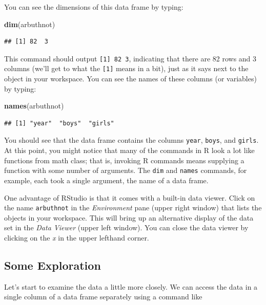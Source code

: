 \documentclass[]{article}
\newenvironment{Shaded}{\begin{snugshade}}{\end{snugshade}}
\newcommand{\KeywordTok}[1]{\textcolor[rgb]{0.13,0.29,0.53}{\textbf{#1}}}
\newcommand{\NormalTok}[1]{#1}
\begin{document}
You can see the dimensions of this data frame by typing:

\begin{Shaded}
\begin{Highlighting}[]
\KeywordTok{dim}\NormalTok{(arbuthnot)}
\end{Highlighting}
\end{Shaded}

\begin{verbatim}
## [1] 82  3
\end{verbatim}

This command should output \texttt{{[}1{]}\ 82\ 3}, indicating that
there are 82 rows and 3 columns (we'll get to what the \texttt{{[}1{]}}
means in a bit), just as it says next to the object in your workspace.
You can see the names of these columns (or variables) by typing:

\begin{Shaded}
\begin{Highlighting}[]
\KeywordTok{names}\NormalTok{(arbuthnot)}
\end{Highlighting}
\end{Shaded}

\begin{verbatim}
## [1] "year"  "boys"  "girls"
\end{verbatim}

You should see that the data frame contains the columns \texttt{year},
\texttt{boys}, and \texttt{girls}. At this point, you might notice that
many of the commands in R look a lot like functions from math class;
that is, invoking R commands means supplying a function with some number
of arguments. The \texttt{dim} and \texttt{names} commands, for example,
each took a single argument, the name of a data frame.

One advantage of RStudio is that it comes with a built-in data viewer.
Click on the name \texttt{arbuthnot} in the \emph{Environment} pane
(upper right window) that lists the objects in your workspace. This will
bring up an alternative display of the data set in the \emph{Data
Viewer} (upper left window). You can close the data viewer by clicking
on the \emph{x} in the upper lefthand corner.

\subsection{Some Exploration}\label{some-exploration}

Let's start to examine the data a little more closely. We can access the
data in a single column of a data frame separately using a command like
\end{document}
